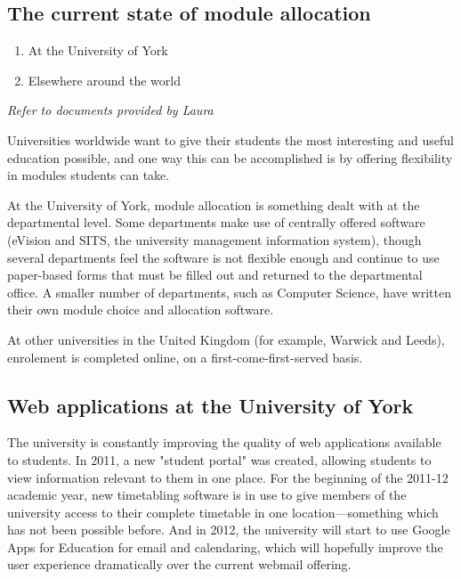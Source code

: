 \documentclass[]{scrartcl}
\begin{document}
\subsection{The current state of module allocation}

\begin{enumerate}
  \item At the University of York
  \item Elsewhere around the world
\end{enumerate}

\textit{Refer to documents provided by Laura}

Universities worldwide want to give their students the most interesting and useful education possible, and one way this can be accomplished is by offering flexibility in modules students can take.

At the University of York, module allocation is something dealt with at the departmental level. Some departments make use of centrally offered software (eVision and SITS, the university management information system), though several departments feel the software is not flexible enough and continue to use paper-based forms that must be filled out and returned to the departmental office. A smaller number of departments, such as Computer Science, have written their own module choice and allocation software.

At other universities in the United Kingdom (for example, Warwick and Leeds), enrolement is completed online, on a first-come-first-served basis.

\subsection{Web applications at the University of York}

The university is constantly improving the quality of web applications available to students. In 2011, a new "student portal" was created, allowing students to view information relevant to them in one place. For the beginning of the 2011-12 academic year, new timetabling software is in use to give members of the university access to their complete timetable in one location---something which has not been possible before. And in 2012, the university will start to use Google Apps for Education for email and calendaring, which will hopefully improve the user experience dramatically over the current webmail offering.
\end{document}
